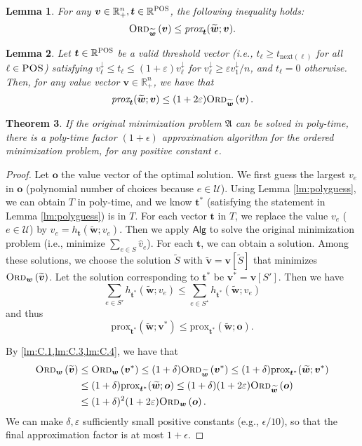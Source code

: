 \documentclass[11pt,a4paper]{article} \usepackage{enumitem}
\newcommand{\calU}{\mathcal{U}}
\newcommand{\ww}{\boldsymbol{\widetilde{w}}}
\newcommand{\da}{\downarrow}
\newcommand{\boldv}{\boldsymbol{v}}
\newcommand{\boldw}{\boldsymbol{w}}
\newcommand{\boldt}{\boldsymbol{t}}
\newcommand{\hv}{\widehat{v}}
\newcommand{\myproblem}{\mathfrak{A}}
\newcommand{\Algo}{\mathsf{Alg}}
\newcommand{\ordered}[2]{\textsc{Ord}_{#1}\left(#2\right)}
\newcommand{\R}{\mathbb{R}}
\newcommand{\Rpos}{\mathbb{R}_+}
\newcommand{\POS}{\textsc{POS}}
\newtheorem{theorem}{Theorem}[section]
\newtheorem{lemma}[theorem]{Lemma}
\theoremstyle{definition}
\begin{document}
\begin{lemma}
\label{lm:C.3}
For any $\boldv\in\Rpos^n,\boldsymbol{t}\in \R^{\POS}$, 
the following inequality holds:
$$\ordered{\widetilde{\boldw}}{\boldv}\leq \text{\em prox}_{\boldt}(\widetilde{\boldw};\boldv).$$
\end{lemma}

\begin{lemma}
\label{lm:C.4}
Let $\boldsymbol{t}\in \R^{\POS}$ be a valid threshold vector
(i.e., $t_\ell \geq t_{\text{next}(\ell)}$ for all $\ell\in \POS$)
satisfying
$v_\ell^\da\leq t_\ell\leq (1+\varepsilon)v_\ell^\da$ for $v_\ell^\da\geq \varepsilon v_1^\da/n$, and $t_\ell=0$ otherwise.
Then, for any value vector $\boldv\in\Rpos^n$, we have that
$$
\text{\em prox}_{\boldsymbol{t}}(\widetilde{\boldw};\boldv)
\leq (1+2\varepsilon)\ordered{\widetilde{\boldw}}{\boldv}.$$
\end{lemma}


\begin{theorem}
If the original minimization problem $\myproblem$ can be solved in poly-time, 
there is a poly-time factor $(1+\epsilon)$ approximation algorithm for the ordered {\em minimization} problem, for any positive constant $\epsilon$.
\end{theorem}

\begin{proof}
Let $\boldsymbol{o}$ the value vector of the optimal solution.
We first guess the largest $v_e$ in $\boldsymbol{o}$ 
(polynomial number of choices because $e\in \calU$).
Using Lemma \ref{lm:polyguess}, we can obtain $T$ in poly-time, 
and we know $\boldt^*$ (satisfying the statement in Lemma \ref{lm:polyguess}) is in $T$.
For each vector $\boldsymbol{t}$ in $T$, we replace the value 
$v_e$ ($e\in \calU$) by 
$\hv_e = h_{\boldsymbol{t}}(\widetilde{\boldw};v_e)$.
Then we apply $\Algo$ to solve the original minimization problem
(i.e., minimize $\sum_{e\in S} \hv_e$). 
For each $\boldsymbol{t}$, we can obtain a solution. Among these solutions, 
we choose the solution $\widetilde{S}$ with $\widetilde{\boldv}=\boldv[\widetilde{S}]$ that minimizes $\ordered{\boldw}{\widetilde{\boldv}}$. Let the solution corresponding to $\boldsymbol{t}^*$ be $\boldv^*=\boldv[S']$. Then we have
$$\sum_{e\in S'} h_{\boldt^*}(\ww;v_e)\leq \sum_{e\in S^\star} h_{\boldt^*}(\ww;v_e)$$
and thus
$$\text{prox}_{\boldsymbol{t}^*}(\ww;\boldv^*)\leq \text{prox}_{\boldsymbol{t}^*}(\ww;\boldsymbol{o}).$$

By \cref{lm:C.1,lm:C.3,lm:C.4}, we have that
\begin{align*}
    \ordered{\boldw}{\widetilde{\boldv}}&\leq\ordered{\boldw}{\boldv^*}\leq (1+\delta)\ordered{\ww}{\boldv^*}\leq (1+\delta)\text{prox}_{\boldsymbol{t}^*}(\ww;\boldv^*)\\
    &\leq (1+\delta)\text{prox}_{\boldsymbol{t}^*}(\ww;\boldsymbol{o})\leq (1+\delta)(1+2\varepsilon)\ordered{\ww}{\boldsymbol{o}}\\
    &\leq (1+\delta)^2(1+2\varepsilon)\ordered{\boldw}{\boldsymbol{o}}.
\end{align*}
We can make $\delta,\varepsilon$ sufficiently small positive constants (e.g., $\epsilon/10$), so that the final approximation factor is at most $1+\epsilon$.
\end{proof}
\end{document}
